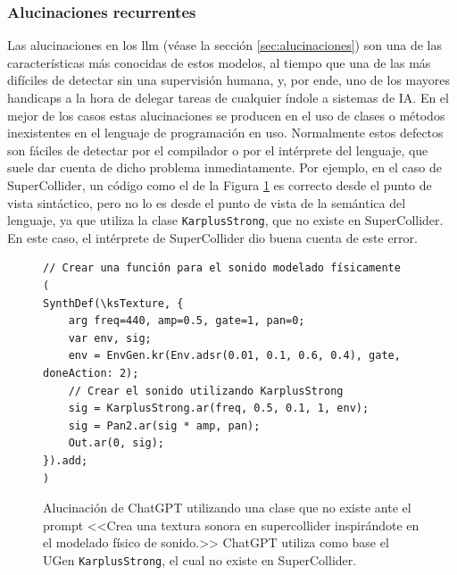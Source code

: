 \subsubsection{Alucinaciones recurrentes}
Las {alucinaciones} en los \gls{llm} (véase la sección \ref{sec:alucinaciones}) son una de las características más conocidas de estos modelos, al tiempo que una de las más difíciles de detectar sin una supervisión humana, y, por ende, uno de los mayores handicaps a la hora de delegar tareas de cualquier índole a sistemas de IA. En el mejor de los casos estas alucinaciones se producen en el uso de clases o métodos inexistentes en el lenguaje de programación en uso. Normalmente estos defectos son fáciles de detectar por el compilador o por el intérprete del lenguaje, que suele dar cuenta de dicho problema inmediatamente. Por ejemplo, en el caso de SuperCollider, un código como el de la Figura \ref{fig:alucinacion_chatgpt} es correcto desde el punto de vista sintáctico, pero no lo es desde el punto de vista de la semántica del lenguaje, ya que utiliza la clase \texttt{KarplusStrong}, que no existe en SuperCollider. En este caso, el intérprete de SuperCollider dio buena cuenta de este error. 

\begin{figure}[H]
    \caption[Alucinación de ChatGPT utilizando una clase que no existe]{Alucinación de ChatGPT utilizando una clase que no existe ante el prompt <<Crea una textura sonora en supercollider inspirándote en el modelado físico de sonido.>> ChatGPT utiliza como base el UGen \texttt{KarplusStrong}, el cual no existe en SuperCollider.}
    \centering
    \begin{lstlisting}[style=SuperCollider-IDE, basicstyle=\footnotesize\ttfamily, numbers=none]
// Crear una función para el sonido modelado físicamente
(
SynthDef(\ksTexture, {
    arg freq=440, amp=0.5, gate=1, pan=0;
    var env, sig;
    env = EnvGen.kr(Env.adsr(0.01, 0.1, 0.6, 0.4), gate, doneAction: 2);
    // Crear el sonido utilizando KarplusStrong
    sig = KarplusStrong.ar(freq, 0.5, 0.1, 1, env);
    sig = Pan2.ar(sig * amp, pan);
    Out.ar(0, sig);
}).add;
)
    \end{lstlisting}
    \source{\propio}
    \label{fig:alucinacion_chatgpt}
\end{figure}


